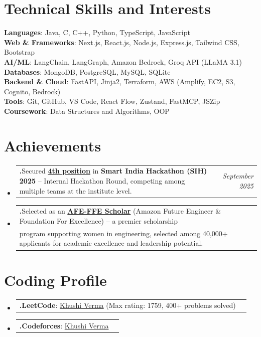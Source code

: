 \documentclass[a4paper,11pt]{article}
\makeatletter
\newcommand{\resumePOR}[3]{
\vspace{0.5mm}\item
    \begin{tabular*}{0.97\textwidth}[t]{l@{\extracolsep{\fill}}r}
        \textbf{#1}\hspace{0.3mm}#2 & \textit{\small{#3}} 
    \end{tabular*}
    \vspace{-2mm}
}
\newcommand{\resumeSubHeadingListStart}{\begin{itemize}[leftmargin=*,labelsep=0mm]}
\newcommand{\resumeSubHeadingListEnd}{\end{itemize}\vspace{2mm}}
\makeatother
\begin{document}
\section{\textbf{Technical Skills and Interests}}
\begin{itemize}[leftmargin=0.05in, label={}]
\small{\item{
  \textbf{Languages}{: Java, C, C++, Python, TypeScript, JavaScript} \\
  \textbf{Web \& Frameworks}{: Next.js, React.js, Node.js, Express.js, Tailwind CSS, Bootstrap} \\
  \textbf{AI/ML}{: LangChain, LangGraph, Amazon Bedrock, Groq API (LLaMA 3.1)} \\
  \textbf{Databases}{: MongoDB, PostgreSQL, MySQL, SQLite} \\
  \textbf{Backend \& Cloud}{: FastAPI, Jinja2, Terraform, AWS (Amplify, EC2, S3, Cognito, Bedrock)} \\
  \textbf{Tools}{: Git, GitHub, VS Code, React Flow, Zustand, FastMCP, JSZip} \\
  \textbf{Coursework}{: Data Structures and Algorithms, OOP} \\
}}
\end{itemize}
\vspace{-16pt}

\section{\textbf{Achievements}}
\vspace{-0.4mm}
\resumeSubHeadingListStart

\resumePOR{.}
{Secured \href{https://drive.google.com/drive/folders/1L8uq5pH7WjI1z3g8GSZ076AgtLmBYh1y}{\textbf{4th position}} in \textbf{Smart India Hackathon (SIH) 2025} -- Internal Hackathon Round, competing among multiple teams at the institute level.}
{September 2025}

\resumePOR{.}
{Selected as an \href{https://drive.google.com/drive/folders/1L8uq5pH7WjI1z3g8GSZ076AgtLmBYh1y}{\textbf{AFE-FFE Scholar}} (Amazon Future Engineer \& Foundation For Excellence) -- a premier scholarship\\ program supporting women in engineering, selected among 40,000+ applicants for academic excellence and leadership potential.}
{}

\resumeSubHeadingListEnd
\vspace{-2mm}

\section{\textbf{Coding Profile}}
\resumeSubHeadingListStart
\resumePOR{.}
{\textbf{LeetCode}: \href{https://leetcode.com/u/ablazed_heart/}{Khushi Verma} (Max rating: 1759, 400+ problems solved)}{}
\resumePOR{.}
{\textbf{Codeforces}: \href{https://codeforces.com/profile/khushiverma39}{Khushi Verma}}{}
\resumeSubHeadingListEnd
\vspace{-5mm}
\end{document}
